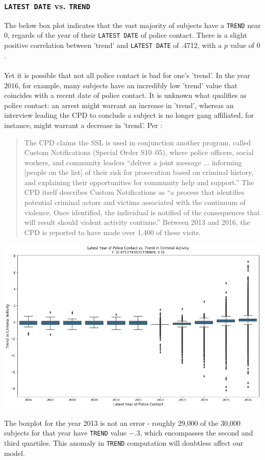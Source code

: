 \subsubsection{\texttt{LATEST DATE} vs. \texttt{TREND}}
The below box plot indicates that the vast majority of subjects have a \texttt{TREND} near $0$, regards of the year of their \texttt{LATEST DATE} of police contact. There is a slight positive correlation between 'trend' and \texttt{LATEST DATE} of .4712, with a $p$ value of $0$.\\\\
Yet it is possible that not all police contact is bad for one's 'trend'. In the year 2016, for example, many subjects have an incredibly low 'trend' value that coincides with a recent date of police contact. It is unknown what qualifies as police contact: an arrest might warrant an increase in 'trend', whereas an interview leading the CPD to conclude a subject is no longer gang affiliated, for instance, might warrant a decrease in 'trend'. Per \cite{upturn}:
\begin{quote}
The CPD claims the SSL is used in conjunction another program, called Custom Notifications (Special Order S10–05), where police officers, social workers, and community leaders “deliver a joint message ... informing [people on the list] of their risk for prosecution based on criminal history, and explaining their opportunities for community help and support.” The CPD itself describes Custom Notifications as “a process that identifies potential criminal actors and victims associated with the continuum of violence. Once identified, the individual is notified of the consequences that will result should violent activity continue.” Between 2013 and 2016, the CPD is reported to have made over 1,400 of these visits.
\end{quote}
\begin{center}
    \includegraphics[scale=.4]{images/trend_vs_date.png}
\end{center}
The boxplot for the year 2013 is not an error - roughly 29,000 of the 30,000 subjects for that year have \texttt{TREND} value $-.3$, which encompasses the second and third quartiles. This anomaly in \texttt{TREND} computation will doubtless affect our model.
